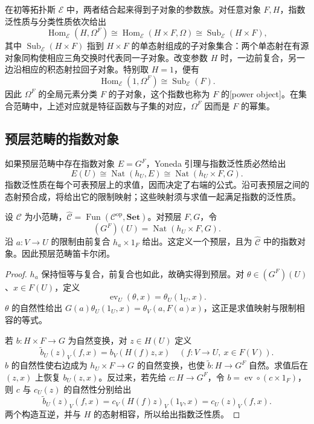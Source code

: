 \ProseParagraphBreak
在初等拓扑斯 \(\mathcal E\) 中，两者结合起来得到子对象的参数族。对任意对象 \(F,H\)，指数泛性质与分类性质依次给出
\[
	\operatorname{Hom}_{\mathcal E}(H,\Omega^F) \cong\operatorname{Hom}_{\mathcal E}(H\times F,\Omega) \cong\operatorname{Sub}_{\mathcal E}(H\times F),
\]
其中 \(\operatorname{Sub}_{\mathcal E}(H\times F)\) 指到 \(H\times F\) 的单态射组成的子对象集合：两个单态射在有源对象同构使相应三角交换时代表同一子对象。改变参数 \(H\) 时，一边前复合，另一边沿相应的积态射拉回子对象。特别取 \(H=1\)，便有
\[
	\operatorname{Hom}_{\mathcal E}(1,\Omega^F) \cong\operatorname{Sub}_{\mathcal E}(F).
\]
因此 \(\Omega^F\) 的全局元素分类 \(F\) 的子对象，这个指数也称为 \(F\) 的[power object]。在集合范畴中，上述对应就是特征函数与子集的对应，\(\Omega^F\) 因而是 \(F\) 的幂集。

\subsection{预层范畴的指数对象}
\label{b4:subsec:E02:02}

如果预层范畴中存在指数对象 \(E=G^F\)，Yoneda 引理与指数泛性质必然给出
\[
	E(U)\cong\operatorname{Nat}(h_U,E) \cong\operatorname{Nat}(h_U\times F,G).
\]
指数泛性质在每个可表预层上的求值，因而决定了右端的公式。沿可表预层之间的态射预合成，将给出它的限制映射；这些映射须与求值一起满足指数的泛性质。

\begin{proposition}\label{b4:prop:presheaf-exponential}
	设 \(\mathcal C\) 为小范畴，\(\widehat{\mathcal C}=\operatorname{Fun}(\mathcal C^{\mathrm{op}},\mathbf{Set})\)。对预层 \(F,G\)，令
	\[
		(G^F)(U)=\operatorname{Nat}(h_U\times F,G).
	\]
	沿 \(a:V\to U\) 的限制由前复合 \(h_a\times1_F\) 给出。这定义一个预层，且为 \(\widehat{\mathcal C}\) 中的指数对象。因此预层范畴笛卡尔闭。
\end{proposition}
\begin{proof}
	\(h_a\) 保持恒等与复合，前复合也如此，故确实得到预层。对 \(\theta\in(G^F)(U)\)、\(x\in F(U)\)，定义
	\[
		\operatorname{ev}_U(\theta,x)=\theta_U(1_U,x).
	\]
	\(\theta\) 的自然性给出 \(G(a)\theta_U(1_U,x)=\theta_V(a,F(a)x)\)，这正是求值映射与限制相容的等式。

	若 \(b:H\times F\to G\) 为自然变换，对 \(z\in H(U)\) 定义
	\[
		\widetilde b_U(z)_V(f,x)=b_V(H(f)z,x) \quad(f:V\to U,\ x\in F(V)).
	\]
	\(b\) 的自然性使右边成为 \(h_U\times F\to G\) 的自然变换，也使 \(\widetilde b:H\to G^F\) 自然。求值后在 \((z,x)\) 上恢复 \(b_U(z,x)\)。反过来，若先给 \(c:H\to G^F\)，令 \(b=\operatorname{ev}\circ(c\times1_F)\)，则 \(c\) 与 \(c_U(z)\) 的自然性分别给出
	\[
		\widetilde b_U(z)_V(f,x) =c_V(H(f)z)_V(1_V,x) =c_U(z)_V(f,x).
	\]
	两个构造互逆，并与 \(H\) 的态射相容，所以给出指数泛性质。
\end{proof}

